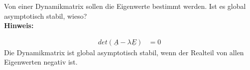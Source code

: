 \begin{question}[section=2,name={Eigenwerte einer Dynamikmatrix},difficulty=5,type=mdl,tags={}]
	Von einer Dynamikmatrix sollen die Eigenwerte bestimmt werden. Ist es global asymptotisch stabil, wieso?
	\\ \textbf{Hinweis:}\\
	
\end{question}
\begin{solution}
	\begin{align}
		det(\underline A - \lambda \underline E) &=0
	\end{align}
	Die Dynamikmatrix ist global asymptotisch stabil, wenn der Realteil von allen Eigenwerten negativ ist. 
\end{solution}